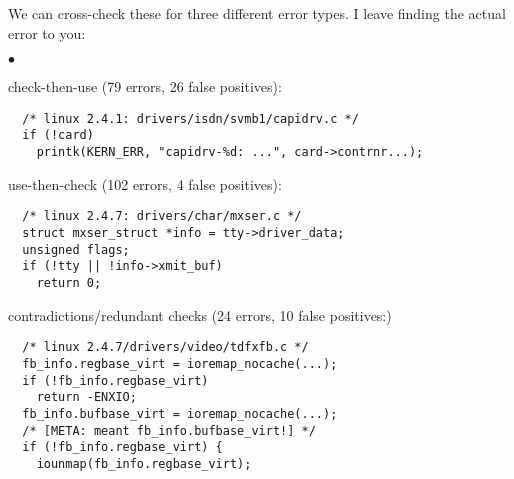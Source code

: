 \documentclass[11pt]{article}
\newcommand{\squishlist}{
 \begin{list}{$\bullet$}
  { \setlength{\itemsep}{0pt}
     \setlength{\parsep}{3pt}
     \setlength{\topsep}{3pt}
     \setlength{\partopsep}{0pt}
     \setlength{\leftmargin}{1.5em}
     \setlength{\labelwidth}{1em}
     \setlength{\labelsep}{0.5em} } }
\newcommand{\squishend}{
  \end{list}  }
\begin{document}
We can cross-check these for three different error types. I leave finding
the actual error to you:
\squishlist
\item check-then-use (79 errors, 26 false positives):
\begin{lstlisting}
  /* linux 2.4.1: drivers/isdn/svmb1/capidrv.c */
  if (!card)
    printk(KERN_ERR, "capidrv-%d: ...", card->contrnr...);
\end{lstlisting}
\item use-then-check (102 errors, 4 false positives):
\begin{lstlisting}
  /* linux 2.4.7: drivers/char/mxser.c */
  struct mxser_struct *info = tty->driver_data;
  unsigned flags;
  if (!tty || !info->xmit_buf)
    return 0;
\end{lstlisting}
\item contradictions/redundant checks (24 errors, 10 false positives:)
\begin{lstlisting}
  /* linux 2.4.7/drivers/video/tdfxfb.c */
  fb_info.regbase_virt = ioremap_nocache(...);
  if (!fb_info.regbase_virt)
    return -ENXIO;
  fb_info.bufbase_virt = ioremap_nocache(...);
  /* [META: meant fb_info.bufbase_virt!] */
  if (!fb_info.regbase_virt) {
    iounmap(fb_info.regbase_virt);
\end{lstlisting}
\squishend
\end{document}
